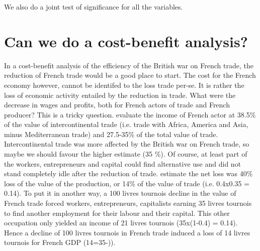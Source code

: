 \documentclass[12pt,a4paper,notitlepage,english]{article}
\begin{document}
 We also do a joint test of significance for all the variables. 


\section{Can we do a cost-benefit analysis?}
\label{sec:cost_benefit}
In a cost-benefit analysis of the efficiency of the British war on French trade, the reduction of French trade would be a good place to start. 
The cost for the French economy however, cannot be identifed to the loss trade per-se.
It is rather the loss of economic activity entailed by the reduction in trade.
What were the decrease in wages and profits, both for French actors of trade and French producer?
This is a tricky question.
\cite[p. 408]{Daudin2005} evaluate the income of French actor at 38.5\% of the value of intercontinental trade (i.e. trade with Africa, America and Asia, minus Mediterranean trade) and 27.5-35\% of the total value of trade.
Intercontinental trade was more affected by the British war on French trade, so maybe we should favour the higher estimate (35 \%).
Of course, at least part of the workers, entrepreneurs and capital could find alternative use and did not stand completely idle after the reduction of trade. 
\cite[p. 421]{Daudin2005} estimate the net loss was 40\% loss of the value of the production, or 14\% of the value of trade (i.e. 0.4x0.35 = 0.14). 
To put it in another way, a 100 livres tournois decline in the value of French trade forced workers, entrepreneurs, capitalists earning 35 livres tournois to find another employment for their labour and their capital. This other occupation only yielded an income of 21 livres tournois (35x(1-0.4) = 0.14).
Hence a decline of 100 livres tournois in French trade induced a loss of 14 livres tournois for French GDP (14=35-)). 
\end{document}
